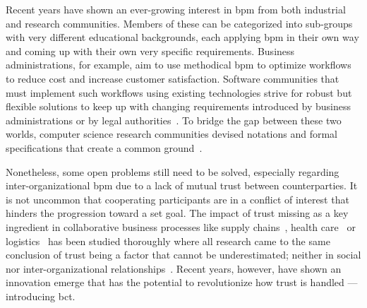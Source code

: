 \label{sec:introduction}


Recent years have shown an ever-growing interest in \gls{bpm} from both industrial and research communities. Members of these can be categorized into sub-groups with very different educational backgrounds, each applying \gls{bpm} in their own way and coming up with their own very specific requirements. Business administrations, for example, aim to use methodical \gls{bpm} to optimize workflows to reduce cost and increase customer satisfaction. Software communities that must implement such workflows using existing technologies strive for robust but flexible solutions to keep up with changing requirements introduced by business administrations or by legal authorities~\cite{weske2012_bpm_introduction}. To bridge the gap between these two worlds, computer science research communities devised notations and formal specifications that create a common ground~\cite{bpmn_v2_spec,weske2012_bpm_process_choreographies,weske2012_bpm_process_orchestration,architecture_for_multi_chain_bp_ladleif}.

Nonetheless, some open problems still need to be solved, especially regarding inter-organizational \gls{bpm} due to a lack of mutual trust between counterparties. It is not uncommon that cooperating participants are in a conflict of interest that hinders the progression toward a set goal. The impact of trust missing as a key ingredient in collaborative business processes like supply chains~\cite{johnston2004_supplier_trust_performance}, health care~\cite{bo_collaboration_between_healthcare_providers_covid_19} or logistics~\cite{fynes2005_impact_of_relationships_on_supply_chain_performance} has been studied thoroughly where all research came to the same conclusion of trust being a factor that cannot be underestimated; neither in social nor inter-organizational relationships~\cite{impact_of_trust_on_supply_chains}. Recent years, however, have shown an innovation emerge that has the potential to revolutionize how trust is handled --- introducing \gls{bct}.

